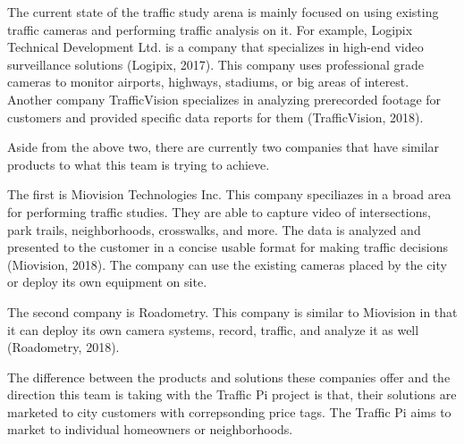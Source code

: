 The current state of the traffic study arena is mainly focused on using existing traffic cameras and performing traffic analysis on it. For example, Logipix Technical Development Ltd. is a company that specializes in high-end video surveillance solutions (Logipix, 2017). This company uses professional grade cameras to monitor airports, highways, stadiums, or big areas of interest. Another company TrafficVision specializes in analyzing prerecorded footage for customers and provided specific data reports for them (TrafficVision, 2018). 

Aside from the above two, there are currently two companies that have similar products to what this team is trying to achieve. 

The first is Miovision Technologies Inc. This company speciliazes in a broad area for performing traffic studies. They are able to capture video of intersections, park trails, neighborhoods, crosswalks, and more. The data is analyzed and presented to the customer in a concise usable format for making traffic decisions (Miovision, 2018). The company can use the existing cameras placed by the city or deploy its own equipment on site. 

The second company is Roadometry. This company is similar to Miovision in that it can deploy its own camera systems, record, traffic, and analyze it as well (Roadometry, 2018).

The difference between the products and solutions these companies offer and the direction this team is taking with the Traffic Pi project is that, their solutions are marketed to city customers with correpsonding price tags. The Traffic Pi aims to market to individual homeowners or neighborhoods.